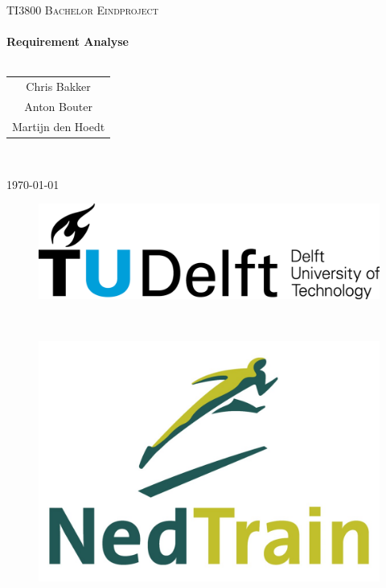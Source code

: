 


\begin{titlepage}
\center
\textsc{\huge TI3800 Bachelor Eindproject}\\[1.5cm]
\HRule \\[0.4cm]
{\Huge \bfseries Requirement Analyse}\\[0.4cm]
\HRule \\[1.5cm]
\begin{Large}
\begin{tabular}{c}
Chris Bakker\\
Anton Bouter\\
Martijn den Hoedt\\
\end{tabular}\\[2cm]
\end{Large}

{\large \today}\\[2cm]

\begin{figure}[b]
\centering
\begin{minipage}{0.4\textwidth}
\begin{flushleft}
\includegraphics[width=0.9\linewidth]{../images/TU_Delft_logo.png}
\end{flushleft}
\end{minipage}
~
\begin{minipage}{0.4\textwidth}
\begin{flushright}
\includegraphics[width=0.9\linewidth]{../images/NedTrain_logo.png}
\end{flushright}
\end{minipage}\\[2cm]
\end{figure}

\vfill

\end{titlepage}

